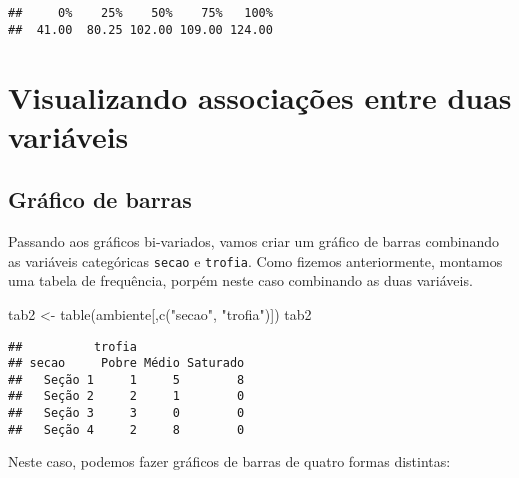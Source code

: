\documentclass[
]{book}
\newenvironment{Shaded}{\begin{snugshade}}{\end{snugshade}}
\newcommand{\AttributeTok}[1]{\textcolor[rgb]{0.77,0.63,0.00}{#1}}
\newcommand{\DecValTok}[1]{\textcolor[rgb]{0.00,0.00,0.81}{#1}}
\newcommand{\FloatTok}[1]{\textcolor[rgb]{0.00,0.00,0.81}{#1}}
\newcommand{\FunctionTok}[1]{\textcolor[rgb]{0.00,0.00,0.00}{#1}}
\newcommand{\NormalTok}[1]{#1}
\newcommand{\OtherTok}[1]{\textcolor[rgb]{0.56,0.35,0.01}{#1}}
\newcommand{\SpecialCharTok}[1]{\textcolor[rgb]{0.00,0.00,0.00}{#1}}
\newcommand{\StringTok}[1]{\textcolor[rgb]{0.31,0.60,0.02}{#1}}
\begin{document}
\begin{Shaded}
\end{Shaded}

\begin{verbatim}
##     0%    25%    50%    75%   100% 
##  41.00  80.25 102.00 109.00 124.00
\end{verbatim}

\hypertarget{visualizando-associauxe7uxf5es-entre-duas-variuxe1veis}{%
\section{Visualizando associações entre duas variáveis}\label{visualizando-associauxe7uxf5es-entre-duas-variuxe1veis}}

\hypertarget{gruxe1fico-de-barras-1}{%
\subsection{Gráfico de barras}\label{gruxe1fico-de-barras-1}}

Passando aos gráficos bi-variados, vamos criar um gráfico de barras combinando as variáveis categóricas \texttt{secao} e \texttt{trofia}. Como fizemos anteriormente, montamos uma tabela de frequência, porpém neste caso combinando as duas variáveis.

\begin{Shaded}
\begin{Highlighting}[]
\NormalTok{tab2 }\OtherTok{\textless{}{-}} \FunctionTok{table}\NormalTok{(ambiente[,}\FunctionTok{c}\NormalTok{(}\StringTok{"secao"}\NormalTok{, }\StringTok{"trofia"}\NormalTok{)])}
\NormalTok{tab2}
\end{Highlighting}
\end{Shaded}

\begin{verbatim}
##          trofia
## secao     Pobre Médio Saturado
##   Seção 1     1     5        8
##   Seção 2     2     1        0
##   Seção 3     3     0        0
##   Seção 4     2     8        0
\end{verbatim}

Neste caso, podemos fazer gráficos de barras de quatro formas distintas:
\end{document}
